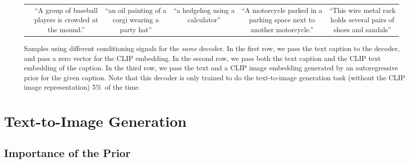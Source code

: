 \documentclass{article}
\begin{document}
\begin{figure*}[t]
\begin{tabular}{cccccc}
        & \scriptsize \makecell{``A group of baseball \\ players is crowded at \\ the mound.''}
        & \scriptsize \makecell{``an oil painting of a \\ corgi wearing a \\ party hat''}
        & \scriptsize \makecell{``a hedgehog using a \\ calculator''}
        & \scriptsize \makecell{``A motorcycle parked in a \\ parking space next to \\ another motorcycle.''}
        & \scriptsize \makecell{``This wire metal rack \\ holds several pairs of \\ shoes and sandals''}
    \end{tabular}
    \caption{Samples using different conditioning signals for the \emph{same} decoder. In the first row, we pass the text caption to the decoder, and pass a zero vector for the CLIP embedding. In the second row, we pass both the text caption and the CLIP text embedding of the caption. In the third row, we pass the text and a CLIP image embedding generated by an autoregressive prior for the given caption. Note that this decoder is only trained to do the text-to-image generation task (without the CLIP image representation) 5\%~of the time.}
    \label{fig:conditioning_info}
    \vskip -0.1in
\end{figure*}

\section{Text-to-Image Generation}

\subsection{Importance of the Prior}
\end{document}
